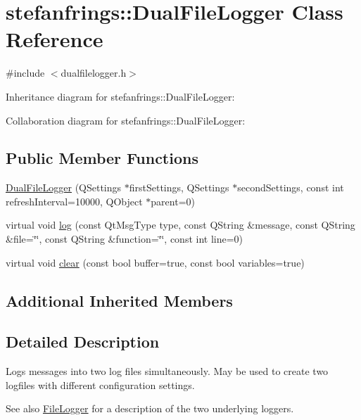 \hypertarget{classstefanfrings_1_1_dual_file_logger}{}\section{stefanfrings\+:\+:Dual\+File\+Logger Class Reference}
\label{classstefanfrings_1_1_dual_file_logger}


{\ttfamily \#include $<$dualfilelogger.\+h$>$}



Inheritance diagram for stefanfrings\+:\+:Dual\+File\+Logger\+:


Collaboration diagram for stefanfrings\+:\+:Dual\+File\+Logger\+:
\subsection*{Public Member Functions}
\begin{DoxyCompactItemize}
\item 
\mbox{\hyperlink{classstefanfrings_1_1_dual_file_logger_ab66f473deccb0ae46a899c799e92441d}{Dual\+File\+Logger}} (Q\+Settings $\ast$first\+Settings, Q\+Settings $\ast$second\+Settings, const int refresh\+Interval=10000, Q\+Object $\ast$parent=0)
\item 
virtual void \mbox{\hyperlink{classstefanfrings_1_1_dual_file_logger_a6db25d5c835b7221f0a6b7b4a035d4aa}{log}} (const Qt\+Msg\+Type type, const Q\+String \&message, const Q\+String \&file=\char`\"{}\char`\"{}, const Q\+String \&function=\char`\"{}\char`\"{}, const int line=0)
\item 
virtual void \mbox{\hyperlink{classstefanfrings_1_1_dual_file_logger_a4af0d2c35121b1f40dbd08b053a53ddf}{clear}} (const bool buffer=true, const bool variables=true)
\end{DoxyCompactItemize}
\subsection*{Additional Inherited Members}


\subsection{Detailed Description}
Logs messages into two log files simultaneously. May be used to create two logfiles with different configuration settings. \begin{DoxySeeAlso}{See also}
\mbox{\hyperlink{classstefanfrings_1_1_file_logger}{File\+Logger}} for a description of the two underlying loggers. 
\end{DoxySeeAlso}


